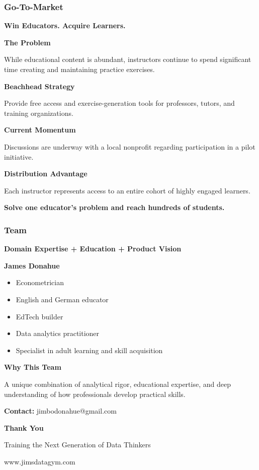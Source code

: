 \documentclass[aspectratio=169]{beamer}
\begin{document}
\begin{frame}
\frametitle{\textcolor{AccentGreen}{Go-To-Market}}

\Large \textbf{Win Educators. Acquire Learners.}

\vspace{0.3cm}

\textbf{The Problem}

While educational content is abundant, instructors continue to spend significant time creating and maintaining practice exercises.

\vspace{0.2cm}

\textbf{Beachhead Strategy}

Provide free access and exercise-generation tools for professors, tutors, and training organizations.

\vspace{0.2cm}

\textbf{Current Momentum}

Discussions are underway with a local nonprofit regarding participation in a pilot initiative.

\vspace{0.2cm}

\textbf{Distribution Advantage}

Each instructor represents access to an entire cohort of highly engaged learners.

\vspace{0.3cm}

\textcolor{AccentGreen}{\textbf{Solve one educator's problem and reach hundreds of students.}}
\end{frame}

\begin{frame}
\frametitle{\textcolor{AccentPink}{Team}}

\Large \textbf{Domain Expertise + Education + Product Vision}

\vspace{0.4cm}

\textbf{James Donahue}

\begin{itemize}
\item Econometrician
\item English and German educator
\item EdTech builder
\item Data analytics practitioner
\item Specialist in adult learning and skill acquisition
\end{itemize}

\vspace{0.4cm}

\textbf{Why This Team}

A unique combination of analytical rigor, educational expertise, and deep understanding of how professionals develop practical skills.

\vfill

\textbf{Contact:} jimbodonahue@gmail.com
\end{frame}

\begin{frame}[plain]
\centering
\vfill
{\Huge \textbf{Thank You}}

\vspace{0.4cm}

{\Large Training the Next Generation of Data Thinkers}

\vfill
\textcolor{AccentPink}{www.jimsdatagym.com}
\end{frame}
\end{document}
